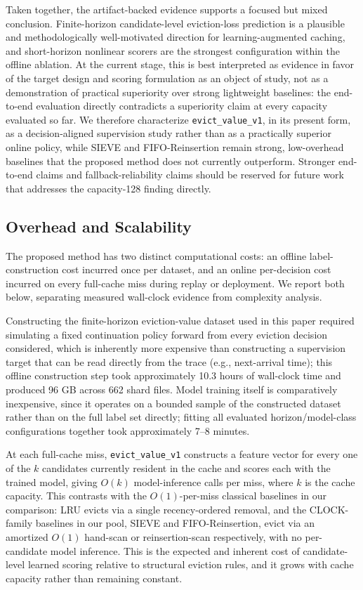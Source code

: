 \documentclass[preprint,12pt]{elsarticle}
\begin{document}
Taken together, the artifact-backed evidence supports a focused but mixed conclusion. Finite-horizon candidate-level eviction-loss prediction is a plausible and methodologically well-motivated direction for learning-augmented caching, and short-horizon nonlinear scorers are the strongest configuration within the offline ablation. At the current stage, this is best interpreted as evidence in favor of the target design and scoring formulation as an object of study, not as a demonstration of practical superiority over strong lightweight baselines: the end-to-end evaluation directly contradicts a superiority claim at every capacity evaluated so far. We therefore characterize \texttt{evict\_value\_v1}, in its present form, as a decision-aligned supervision study rather than as a practically superior online policy, while SIEVE and FIFO-Reinsertion remain strong, low-overhead baselines that the proposed method does not currently outperform. Stronger end-to-end claims and fallback-reliability claims should be reserved for future work that addresses the capacity-128 finding directly.

\subsection{Overhead and Scalability}
\label{subsec:overhead_scalability}

The proposed method has two distinct computational costs: an offline label-construction cost incurred once per dataset, and an online per-decision cost incurred on every full-cache miss during replay or deployment. We report both below, separating measured wall-clock evidence from complexity analysis.

Constructing the finite-horizon eviction-value dataset used in this paper required simulating a fixed continuation policy forward from every eviction decision considered, which is inherently more expensive than constructing a supervision target that can be read directly from the trace (e.g., next-arrival time); this offline construction step took approximately 10.3 hours of wall-clock time and produced 96 GB across 662 shard files. Model training itself is comparatively inexpensive, since it operates on a bounded sample of the constructed dataset rather than on the full label set directly; fitting all evaluated horizon/model-class configurations together took approximately 7--8 minutes.

At each full-cache miss, \texttt{evict\_value\_v1} constructs a feature vector for every one of the $k$ candidates currently resident in the cache and scores each with the trained model, giving $O(k)$ model-inference calls per miss, where $k$ is the cache capacity. This contrasts with the $O(1)$-per-miss classical baselines in our comparison: LRU evicts via a single recency-ordered removal, and the CLOCK-family baselines in our pool, SIEVE and FIFO-Reinsertion, evict via an amortized $O(1)$ hand-scan or reinsertion-scan respectively, with no per-candidate model inference. This is the expected and inherent cost of candidate-level learned scoring relative to structural eviction rules, and it grows with cache capacity rather than remaining constant.
\end{document}
